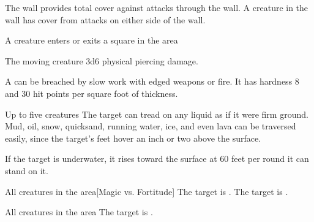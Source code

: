 The wall provides total cover against attacks through the wall. A creature in the wall has cover from attacks on either side of the wall.
\begin{spelltrigger}{A creature enters or exits a square in the area}
    \begin{spelltarget}{The moving creature}
        \spelleffect 3d6 physical piercing damage.
    \end{spelltarget}
\end{spelltrigger}
\spellnotes A  can be breached by slow work with edged weapons or fire. It has hardness 8 and 30 hit points per square foot of thickness.

\spelldur{\durlong \dismissable}
\begin{spelltargets}{Up to five creatures}
    \spelleffect The target can tread on any liquid as if it were firm ground. Mud, oil, snow, quicksand, running water, ice, and even lava can be traversed easily, since the target's feet hover an inch or two above the surface.
    \par If the target is underwater, it rises toward the surface at 60 feet per round it can stand on it.
\end{spelltargets}

\spelldur{\durshort}
\begin{spelltargets}{All creatures in the area}[Magic vs. Fortitude]
    \spellsuccess The target is \exhausted.
    \spellfailure The target is \fatigued.
\end{spelltargets}

\spelldur{\durshort}
\begin{spelltargets}{All creatures in the area}
    \spelleffect The target is \fatigued.
\end{spelltargets}

